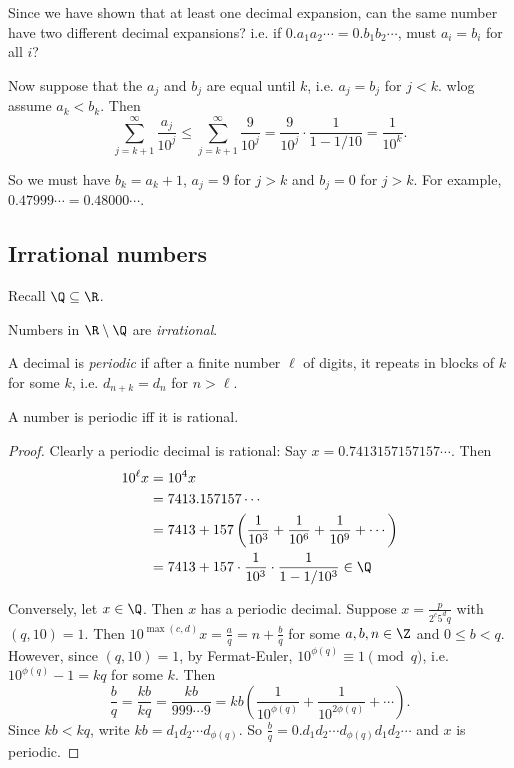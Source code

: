 \documentclass[a4paper]{article}
\begin{document}
  Since we have shown that at least one decimal expansion, can the same number have two different decimal expansions? i.e. if $0.a_1a_2\cdots = 0.b_1b_2\cdots$, must $a_i = b_i$ for all $i$?

  Now suppose that the $a_j$ and $b_j$ are equal until $k$, i.e. $a_j = b_j$ for $j < k$. wlog assume $a_k < b_k$. Then
  \[
    \sum_{j = k + 1}^\infty \frac{a_j}{10^j} \leq \sum_{j = k+1}^\infty \frac{9}{10^j} = \frac{9}{10^j}\cdot \frac{1}{1 - 1/10} = \frac{1}{10^k}.
  \]

  So we must have $b_k = a_k + 1$, $a_j = 9$ for $j > k$ and $b_j = 0$ for $j > k$. For example, $0.47999\cdots = 0.48000\cdots$.

  \subsection{Irrational numbers}
  Recall $\Q\subseteq \R$.
  \begin{defi}
    Numbers in $\R\setminus \Q$ are \emph{irrational}.
  \end{defi}

  \begin{defi}
    A decimal is \emph{periodic} if after a finite number $\ell$ of digits, it repeats in blocks of $k$ for some $k$, i.e. $d_{n + k} = d_n$ for $n > \ell$.
  \end{defi}

  \begin{prop}
    A number is periodic iff it is rational.
  \end{prop}

  \begin{proof}
    Clearly a periodic decimal is rational: Say $x = 0.7413157157157\cdots$. Then
    \begin{align*}
      10^\ell x &= 10^4x\\
      &= 7413.157157\cdots \\
      &= 7413 + 157\left(\frac{1}{10^3} + \frac{1}{10^6} + \frac{1}{10^9} + \cdots\right)\\
      &= 7413 + 157\cdot \frac{1}{10^3}\cdot \frac{1}{1 - 1/10^3}\in \Q
    \end{align*}

    Conversely, let $x\in \Q$. Then $x$ has a periodic decimal. Suppose $x = \frac{p}{2^c5^dq}$ with $(q, 10) = 1$. Then $10^{\max(c, d)}x = \frac{a}{q} = n + \frac{b}{q}$ for some $a, b, n\in \Z$ and $0\leq b < q$. However, since $(q, 10) = 1$, by Fermat-Euler, $10^{\phi(q)}\equiv 1\pmod q$, i.e. $10^{\phi(q)} - 1 = kq$ for some $k$. Then 
    \[
      \frac{b}{q} = \frac{kb}{kq} = \frac{kb}{999\cdots 9} = kb\left(\frac{1}{10^{\phi(q)}} + \frac{1}{10^{2\phi(q)}} + \cdots \right).
    \]
    Since $kb < kq$, write $kb = d_1d_2\cdots d_{\phi(q)}$. So $\frac{b}{q} = 0.d_1d_2\cdots d_{\phi(q)}d_1d_2\cdots$ and $x$ is periodic.
  \end{proof}
\end{document}
